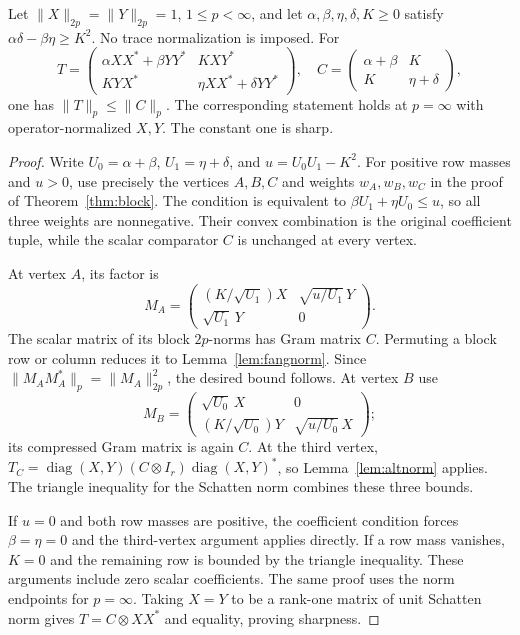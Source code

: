 \begin{theorem}\label{thm:normblock}
Let $\|X\|_{2p}=\|Y\|_{2p}=1$, $1\le p<\infty$, and let
$\alpha,\beta,\eta,\delta,K\ge0$ satisfy
$\alpha\delta-\beta\eta\ge K^2$. No trace normalization is imposed.
For
\[
 T=\begin{pmatrix}
 \alpha XX^*+\beta YY^*&KXY^*\\
 KYX^*&\eta XX^*+\delta YY^*
 \end{pmatrix},\quad
 C=\begin{pmatrix}\alpha+\beta&K\\K&\eta+\delta\end{pmatrix},
\]
one has $\|T\|_p\le\|C\|_p$. The corresponding statement holds at
$p=\infty$ with operator-normalized $X,Y$. The constant one is sharp.
\end{theorem}
\begin{proof}
Write $U_0=\alpha+\beta$, $U_1=\eta+\delta$, and
$u=U_0U_1-K^2$. For positive row masses and $u>0$, use precisely the
vertices $A,B,C$ and weights $w_A,w_B,w_C$ in the proof of
Theorem~\ref{thm:block}. The condition is equivalent to
$\beta U_1+\eta U_0\le u$, so all three weights are nonnegative.
Their convex combination is the original coefficient tuple, while the
scalar comparator $C$ is unchanged at every vertex.

At vertex $A$, its factor is
\[
 M_A=\begin{pmatrix}(K/\sqrt{U_1})X&\sqrt{u/U_1}\,Y\\
                         \sqrt{U_1}\,Y&0\end{pmatrix}.
\]
The scalar matrix of its block $2p$-norms has Gram matrix $C$.
Permuting a block row or column reduces it to Lemma~\ref{lem:fangnorm}.
Since $\|M_AM_A^*\|_p=\|M_A\|_{2p}^2$, the desired bound follows.
At vertex $B$ use
\[
 M_B=\begin{pmatrix}\sqrt{U_0}\,X&0\\
                (K/\sqrt{U_0})Y&\sqrt{u/U_0}\,X\end{pmatrix};
\]
its compressed Gram matrix is again $C$. At the third vertex,
$T_C=\operatorname{diag}(X,Y)(C\otimes I_r)\operatorname{diag}(X,Y)^*$,
so Lemma~\ref{lem:altnorm} applies. The triangle inequality for the
Schatten norm combines these three bounds.

If $u=0$ and both row masses are positive, the coefficient condition
forces $\beta=\eta=0$ and the third-vertex argument applies directly.
If a row mass vanishes, $K=0$ and the remaining row is bounded by the
triangle inequality. These arguments include zero scalar coefficients.
The same proof uses the norm endpoints for $p=\infty$. Taking $X=Y$
to be a rank-one matrix of unit Schatten norm gives
$T=C\otimes XX^*$ and equality, proving sharpness.
\end{proof}

